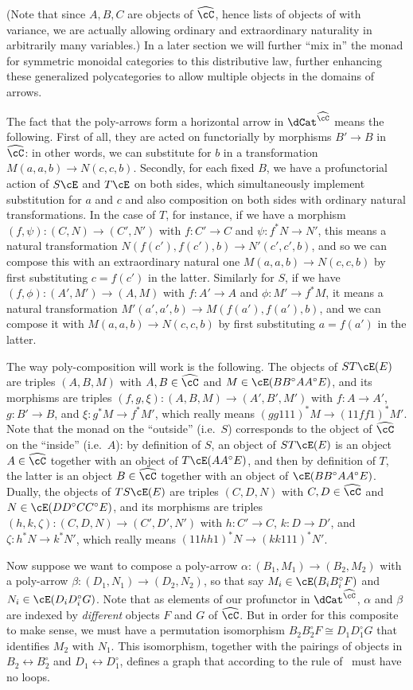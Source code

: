 \documentclass{amsart}
\newcommand{\C}{\cC}
\renewcommand{\Chat}{\ensuremath{\widehat{\C}}\xspace}
\newcommand{\E}{\cE}
\renewcommand{\o}{^{\circ}}
\begin{document}
(Note that since $A,B,C$ are objects of $\Chat$, hence lists of objects of \C with variance, we are actually allowing ordinary and extraordinary naturality in arbitrarily many variables.)
In a later section we will further ``mix in'' the monad for symmetric monoidal categories to this distributive law, further enhancing these generalized polycategories to allow multiple objects in the domains of arrows.

The fact that the poly-arrows form a horizontal arrow \cM in $\dCat^{\Chat}$ means the following.
First of all, they are acted on functorially by morphisms $B'\to B$ in $\Chat$: in other words, we can substitute for $b$ in a transformation $M(a,a,b) \to N(c,c,b)$.
Secondly, for each fixed $B$, we have a profunctorial action of $S\E$ and $T\E$ on both sides, which simultaneously implement substitution for $a$ and $c$ and also composition on both sides with ordinary natural transformations.
In the case of $T$, for instance, if we have a morphism $(f,\psi) : (C,N)\to (C',N')$ with $f:C'\to C$ and $\psi : f^* N \to N'$, this means a natural transformation $N(f(c'),f(c'),b) \to N'(c',c',b)$, and so we can compose this with an extraordinary natural one $M(a,a,b) \to N(c,c,b)$ by first substituting $c=f(c')$ in the latter.
Similarly for $S$, if we have $(f,\phi) : (A',M')\to (A,M)$ with $f:A'\to A$ and $\phi : M' \to f^*M$, it means a natural transformation $M'(a',a',b) \to M(f(a'),f(a'),b)$, and we can compose it with $M(a,a,b) \to N(c,c,b)$ by first substituting $a=f(a')$ in the latter.

The way poly-composition will work is the following.
The objects of $ST\E(E)$ are triples $(A,B,M)$ with $A,B\in \Chat$ and $M\in \E(B B\o A A\o E)$, and its morphisms are triples $(f,g,\xi):(A,B,M) \to (A',B',M')$ with $f:A\to A'$, $g:B'\to B$, and $\xi:g^*M \to f^*M'$, which really means $(gg111)^*M \to (11ff1)^*M'$.
Note that the monad on the ``outside'' (i.e.\ $S$) corresponds to the object of \Chat on the ``inside'' (i.e.\ $A$): by definition of $S$, an object of $ST\E(E)$ is an object $A\in\Chat$ together with an object of $T\E(A A\o E)$, and then by definition of $T$, the latter is an object $B\in\Chat$ together with an object of $\E(B B\o A A\o E)$.
Dually, the objects of $TS\E(E)$ are triples $(C,D,N)$ with $C,D\in \Chat$ and $N\in \E(D D\o C C\o E)$, and its morphisms are triples $(h,k,\zeta):(C,D,N) \to (C',D',N')$ with $h:C'\to C$, $k:D\to D'$, and $\zeta:h^*N \to k^*N'$, which really means $(11hh1)^*N \to (kk111)^*N'$.

Now suppose we want to compose a poly-arrow $\alpha : (B_1,M_1)\to (B_2,M_2)$ with a poly-arrow $\beta : (D_1,N_1) \to (D_2,N_2)$, so that say $M_i\in \E(B_i B_i\o F)$ and $N_i\in \E(D_i D_i\o G)$.
Note that as elements of our profunctor \cM in $\dCat^{\Chat}$, $\alpha$ and $\beta$ are indexed by \emph{different} objects $F$ and $G$ of \Chat.
But in order for this composite to make sense, we must have a permutation isomorphism $B_2 B_2\o F \cong D_1 D_1\o G$ that identifies $M_2$ with $N_1$.
This isomorphism, together with the pairings of objects in $B_2\leftrightarrow B_2\o$ and $D_1 \leftrightarrow D_1\o$, defines a graph that according to the rule of~\cite{ek:gen-funct-calc} must have no loops.
\end{document}
